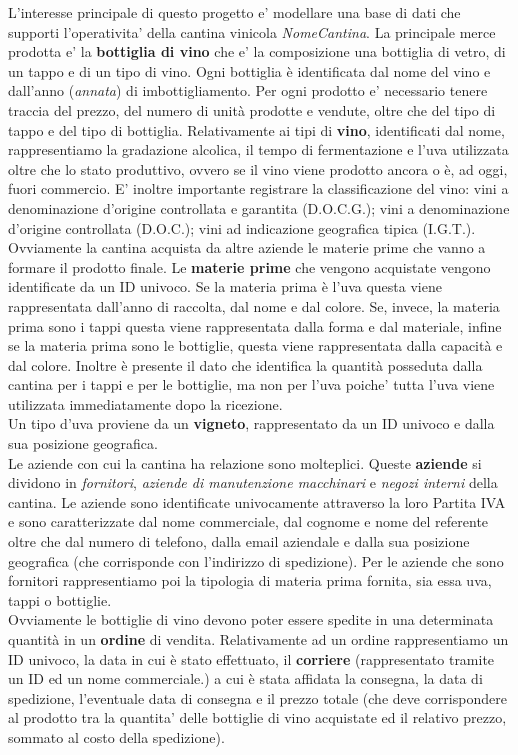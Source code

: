L'interesse principale di questo progetto e' modellare una base di dati che supporti l'operativita' della cantina vinicola \emph{NomeCantina}. La principale merce prodotta e' la \textbf{bottiglia di vino} che e' la composizione una bottiglia di vetro, di un tappo e di un tipo di vino. Ogni bottiglia è identificata dal nome del vino e dall'anno (\emph{annata}) di imbottigliamento. Per ogni prodotto e' necessario tenere traccia del prezzo, del numero di unità prodotte e vendute, oltre che del tipo di tappo e del tipo di bottiglia.
Relativamente ai tipi di \textbf{vino}, identificati dal nome, rappresentiamo la gradazione alcolica, il tempo di fermentazione e l'uva utilizzata oltre che lo stato produttivo, ovvero se il vino viene prodotto ancora o è, ad oggi, fuori commercio. E' inoltre importante registrare la classificazione del vino: vini a denominazione d'origine controllata e garantita (D.O.C.G.); vini a denominazione d'origine controllata (D.O.C.); vini ad indicazione geografica tipica (I.G.T.).\\ Ovviamente la cantina acquista da altre aziende le materie prime che vanno a formare il prodotto finale. Le \textbf{materie prime} che vengono acquistate vengono identificate da un ID univoco. Se la materia prima è l'uva questa viene rappresentata dall'anno di raccolta, dal nome e dal colore. Se, invece, la materia prima sono i tappi questa viene rappresentata dalla forma e dal materiale, infine se la materia prima sono le bottiglie, questa viene rappresentata dalla capacità e dal colore. Inoltre è presente il dato che identifica la quantità posseduta dalla cantina per i tappi e per le bottiglie, ma non per l'uva poiche' tutta l'uva viene utilizzata immediatamente dopo la ricezione.\\
Un tipo d'uva proviene da un \textbf{vigneto}, rappresentato da un ID univoco e dalla sua posizione geografica. \\
Le aziende con cui la cantina ha relazione sono molteplici. Queste \textbf{aziende} si dividono in \emph{fornitori}, \emph{aziende di manutenzione macchinari} e \emph{negozi interni} della cantina. Le aziende sono identificate univocamente attraverso la loro Partita IVA e sono caratterizzate dal nome commerciale, dal cognome e nome del referente oltre che dal numero di telefono, dalla email aziendale e dalla sua posizione geografica (che corrisponde con l'indirizzo di spedizione). Per le aziende che sono fornitori rappresentiamo poi la tipologia di materia prima fornita, sia essa uva, tappi o bottiglie.\\
Ovviamente le bottiglie di vino devono poter essere spedite in una determinata quantità in un \textbf{ordine} di vendita. Relativamente ad un ordine rappresentiamo un ID univoco, la data in cui è stato effettuato, il \textbf{corriere} (rappresentato tramite un ID ed un nome commerciale.) a cui è stata affidata la consegna, la data di spedizione, l'eventuale data di consegna e il prezzo totale (che deve corrispondere al prodotto tra la quantita' delle bottiglie di vino acquistate ed il relativo prezzo, sommato al costo della spedizione).\\
